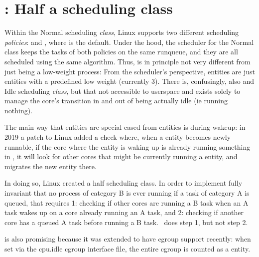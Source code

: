 
\section{\schedidle{}: Half a scheduling class}\label{s:idle}

Within the Normal scheduling \textit{class}, Linux supports two different
scheduling \textit{policies}: \schednormal{} and \schedidle{}, where
\schednormal{} is the default. Under the hood, the scheduler for the Normal
class keeps the tasks of both policies on the same runqueue, and they are all
scheduled using the same algorithm. Thus, \schedidle{} is in principle not very
different from just being a low-weight process: From the scheduler's
perspective, \schedidle{} entities are just entities with a predefined low
weight (currently 3). There is, confusingly, also and Idle scheduling
\textit{class}, but that not accessible to userspace and exists solely to manage
the core's transition in and out of being actually idle (ie running nothing).

The main way that \schedidle{} entities are special-cased from \schednormal{}
entities is during wakeup: in 2019 a patch to Linux\cite{fixing-sched-idle-lwn}
added a check where, when a \schednormal{} entity becomes newly runnable, if the
core where the entity is waking up is already running something in
\schednormal{}, it will look for other cores that might be currently running a
\schedidle{} entity, and migrates the new entity there.

In doing so, Linux created a half scheduling class. In order to implement fully
invariant that no process of category B is ever running if a task of category A
is queued, that requires 1: checking if other cores are running a B task when an
A task wakes up on a core already running an A task, and 2: checking if another
core has a queued A task before running a B task.\ \schedidle{} does step 1, but
not step 2.

\schedidle{} is also promising because it was extended to have cgroup support
recently\cite{cgroup-idle-patch}: when set via the cpu.idle cgroup interface
file, the entire cgroup is counted as a \schedidle{} entity.

